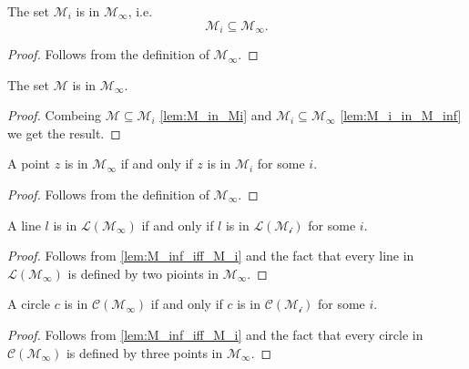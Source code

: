 \begin{lemma}
    \label{lem:M_i_in_M_inf}
    \leanok
    The set $\mathcal{M}_i$ is in $\mathcal{M}_{\infty}$, i.e. $$\mathcal{M}_i \subseteq \mathcal{M}_{\infty}.$$
\end{lemma}
\begin{proof}
    Follows from the definition of $\mathcal{M}_{\infty}$.
\end{proof}

\begin{lemma}
    \label{lem:M_in_M_inf}
    \leanok
    The set $\mathcal{M}$ is in $\mathcal{M}_{\infty}$.
\end{lemma}
\begin{proof}
    Combeing $\mathcal{M} \subseteq \mathcal{M}_i$ \ref{lem:M_in_Mi} and $\mathcal{M}_i \subseteq \mathcal{M}_{\infty}$ \ref{lem:M_i_in_M_inf} we get the result.
\end{proof}

\begin{lemma}
    \label{lem:M_inf_iff_M_i}
    \leanok
    A point $z$ is in $\mathcal{M}_{\infty}$ if and only if $z$ is in $\mathcal{M}_i$ for some $i$.
\end{lemma}
\begin{proof}
    Follows from the definition of $\mathcal{M}_{\infty}$.
\end{proof}

\begin{corollary}
    \label{cor:L_M_inf_iff_L_M_i}
    \leanok
    A line $l$ is in $\mathcal{L(M_{\infty})}$ if and only if $l$ is in $\mathcal{L(M_i)}$ for some $i$.
\end{corollary}
\begin{proof}
    Follows from \ref{lem:M_inf_iff_M_i} and the fact that every line in $\mathcal{L(M_{\infty})}$ is defined by two pioints in $\mathcal{M_{\infty}}$.
\end{proof}

\begin{corollary}
    \label{cor:C_M_inf_iff_C_M_i}
    \leanok
    A circle $c$ is in $\mathcal{C(M_{\infty})}$ if and only if $c$ is in $\mathcal{C(M_i)}$ for some $i$.
\end{corollary}
\begin{proof}
    Follows from \ref{lem:M_inf_iff_M_i} and the fact that every circle in $\mathcal{C(M_{\infty})}$ is defined by three points in $\mathcal{M_{\infty}}$.
\end{proof}

